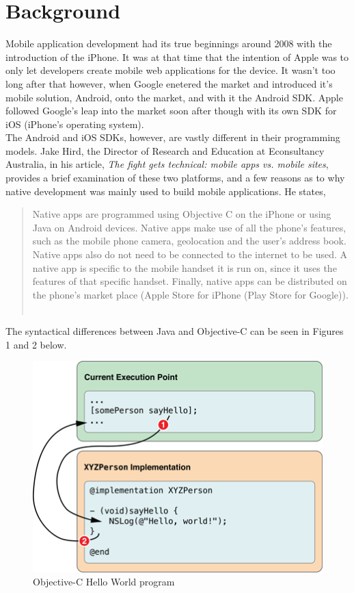 \documentclass[11pt, twocolumn]{article}
\begin{document}
\section{Background}
Mobile application development had its true beginnings around 2008 with the introduction of the iPhone.  It was at that time that the intention of Apple was to only let developers create mobile web applications for the device.  It wasn't too long after that however, when Google enetered the market and introduced it's mobile solution, Android, onto the market, and with it the Android SDK.  Apple followed Google's leap into the market soon after though with its own SDK for iOS (iPhone's operating system).~\cite{Mims2013} \\

The Android and iOS SDKs, however, are vastly different in their programming models.  Jake Hird, the Director of Research and Education at Econsultancy Australia, in his article, {\it The fight gets technical: mobile apps vs. mobile sites}, provides a brief examination of these two platforms, and a few reasons as to why native development was mainly used to build mobile applications.  He states,

\begin{quote}
Native apps are programmed using Objective C on the iPhone or using Java on Android devices.  Native apps make use of all the phone's features, such as the mobile phone camera, geolocation and the user's address book.   Native apps also do not need to be connected to the internet to be used.  A native app is specific to the mobile handset it is run on, since it uses the features of that specific handset.  Finally, native apps can be distributed on the phone's market place (Apple Store for iPhone (Play Store for Google)). ~\cite{Hird2011}
\end{quote}

The syntactical differences between Java and Objective-C can be seen in Figures 1 and 2 below.\\

\begin{figure}[h]
\includegraphics[scale=0.5]{objectiveChelloWorld}
\caption{Objective-C Hello World program ~\cite{Developer.Apple.com}}
\end{figure}
\end{document}
